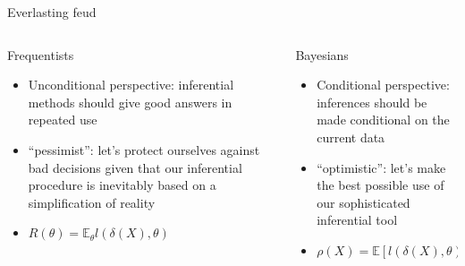 \begin{frame}{Everlasting feud}
    \begin{columns}[T]
    \begin{column}[T]{0.45\textwidth}
    \begin{block}{Frequentists}
        \begin{itemize}
            \item Unconditional perspective: inferential methods should give good answers in repeated use
            \item ``pessimist'': let's protect ourselves against bad decisions given that our inferential procedure is inevitably based on a simplification of reality
            \item $R(\theta) = \mathbb{E}_\theta l(\delta(X),\theta)$
        \end{itemize}
    \end{block}
    \end{column}
    \begin{column}[T]{0.45\textwidth}
    \begin{block}{Bayesians}
    \begin{itemize}
            \item Conditional perspective: inferences should be made conditional on the current data
            \item ``optimistic'': let's make the best possible use of our sophisticated inferential tool
            \item $\rho(X) = \mathbb{E}[l(\delta(X),\theta)|X]$
        \end{itemize}
        
    \end{block}
    \end{column}
    \end{columns}
    

\end{frame}

